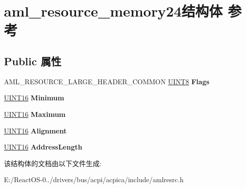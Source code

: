 \hypertarget{structaml__resource__memory24}{}\section{aml\+\_\+resource\+\_\+memory24结构体 参考}
\label{structaml__resource__memory24}
\subsection*{Public 属性}
\begin{DoxyCompactItemize}
\item 
\mbox{\label{structaml__resource__memory24_af0af3fd13ce4c27b3b8de1e47ecc905b}} 
A\+M\+L\+\_\+\+R\+E\+S\+O\+U\+R\+C\+E\+\_\+\+L\+A\+R\+G\+E\+\_\+\+H\+E\+A\+D\+E\+R\+\_\+\+C\+O\+M\+M\+ON \hyperlink{_processor_bind_8h_ab27e9918b538ce9d8ca692479b375b6a}{U\+I\+N\+T8} {\bfseries Flags}
\item 
\mbox{\label{structaml__resource__memory24_a560c07db6962a9afce9395256b4d2b5c}} 
\hyperlink{_processor_bind_8h_a09f1a1fb2293e33483cc8d44aefb1eb1}{U\+I\+N\+T16} {\bfseries Minimum}
\item 
\mbox{\label{structaml__resource__memory24_ad05b79736a617957b1473106547dc652}} 
\hyperlink{_processor_bind_8h_a09f1a1fb2293e33483cc8d44aefb1eb1}{U\+I\+N\+T16} {\bfseries Maximum}
\item 
\mbox{\label{structaml__resource__memory24_ac3c3e0741bb80e314c068293840f609f}} 
\hyperlink{_processor_bind_8h_a09f1a1fb2293e33483cc8d44aefb1eb1}{U\+I\+N\+T16} {\bfseries Alignment}
\item 
\mbox{\label{structaml__resource__memory24_af28f488702f51ccaefb0e91bca6d1aa9}} 
\hyperlink{_processor_bind_8h_a09f1a1fb2293e33483cc8d44aefb1eb1}{U\+I\+N\+T16} {\bfseries Address\+Length}
\end{DoxyCompactItemize}


该结构体的文档由以下文件生成\+:\begin{DoxyCompactItemize}
\item 
E\+:/\+React\+O\+S-\/0../drivers/bus/acpi/acpica/include/amlresrc.\+h\end{DoxyCompactItemize}
